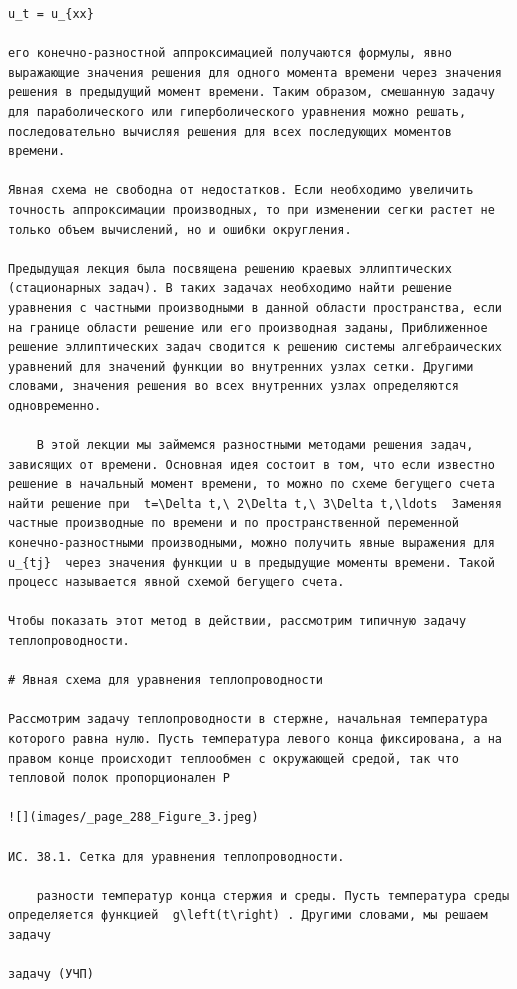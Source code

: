 \documentclass[
  ukrainian,
]{article}
\begin{document}
\begin{verbatim}
u_t = u_{xx}

его конечно-разностной аппроксимацией получаются формулы, явно выражающие значения решения для одного момента времени через значения решения в предыдущий момент времени. Таким образом, смешанную задачу для параболического или гиперболического уравнения можно решать, последовательно вычисляя решения для всех последующих моментов времени.

Явная схема не свободна от недостатков. Если необходимо увеличить точность аппроксимации производных, то при изменении сегки растет не только объем вычислений, но и ошибки округления.

Предыдущая лекция была посвящена решению краевых эллиптических (стационарных задач). В таких задачах необходимо найти решение уравнения с частными производными в данной области пространства, если на границе области решение или его производная заданы, Приближенное решение эллиптических задач сводится к решению системы алгебраических уравнений для значений функции во внутренних узлах сетки. Другими словами, значения решения во всех внутренних узлах определяются одновременно.

    В этой лекции мы займемся разностными методами решения задач, зависящих от времени. Основная идея состоит в том, что если известно решение в начальный момент времени, то можно по схеме бегущего счета найти решение при  t=\Delta t,\ 2\Delta t,\ 3\Delta t,\ldots  Заменяя частные производные по времени и по пространственной переменной конечно-разностными производными, можно получить явные выражения для  u_{tj}  через значения функции u в предыдущие моменты времени. Такой процесс называется явной схемой бегущего счета.

Чтобы показать этот метод в действии, рассмотрим типичную задачу теплопроводности.

# Явная схема для уравнения теплопроводности

Рассмотрим задачу теплопроводности в стержне, начальная температура которого равна нулю. Пусть температура левого конца фиксирована, а на правом конце происходит теплообмен с окружающей средой, так что тепловой полок пропорционален Р

![](images/_page_288_Figure_3.jpeg)

ИС. 38.1. Сетка для уравнения теплопроводности.

    разности температур конца стержия и среды. Пусть температура среды определяется функцией  g\left(t\right) . Другими словами, мы решаем задачу

задачу (УЧП)


\end{verbatim}
\end{document}
